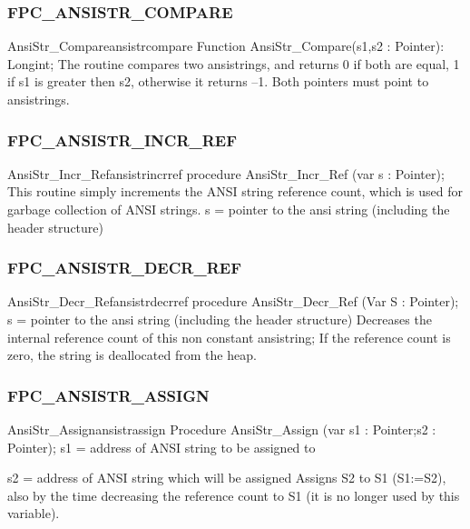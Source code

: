 \documentclass [a4paper,12pt]{article}
\begin{document}
\subsubsection{FPC{\_}ANSISTR{\_}COMPARE}
\label{subsubsec:mylabel40}

\begin{functionl}{AnsiStr{\_}Compare}{ansistrcompare}
\Declaration
Function AnsiStr{\_}Compare(s1,s2 : Pointer): Longint;
\Description
The routine compares two ansistrings, and returns 0 if both are equal, 1 if
\textsf{s1} is greater then \textsf{s2}, otherwise it returns --1.
\Parameters
Both pointers must point to ansistrings.
\end{functionl}

\subsubsection{FPC{\_}ANSISTR{\_}INCR{\_}REF }
\label{subsubsec:mylabel41}

\begin{procedurel}{AnsiStr{\_}Incr{\_}Ref}{ansistrincrref}
\Declaration
procedure AnsiStr{\_}Incr{\_}Ref (var s : Pointer);
\Description
This routine simply increments the ANSI string reference count, which is
used for garbage collection of ANSI strings.
\Parameters
s = pointer to the ansi string (including the header structure)
\end{procedurel}

\subsubsection{FPC{\_}ANSISTR{\_}DECR{\_}REF }
\label{subsubsec:mylabel42}

\begin{procedurel}{AnsiStr{\_}Decr{\_}Ref}{ansistrdecrref}
\Declaration
procedure AnsiStr{\_}Decr{\_}Ref (Var S : Pointer);
\Parameters
s = pointer to the ansi string (including the header structure)
\Algorithm
Decreases the internal reference count of this non constant ansistring; If
the reference count is zero, the string is deallocated from the
heap.
\end{procedurel}

\subsubsection{FPC{\_}ANSISTR{\_}ASSIGN }
\label{subsubsec:mylabel43}

\begin{functionl}{AnsiStr{\_}Assign}{ansistrassign}
\Declaration
Procedure AnsiStr{\_}Assign (var s1 : Pointer;s2 : Pointer);
\Parameters
s1 = address of ANSI string to be assigned to  \par
s2 = address of ANSI string which will be assigned
\Algorithm
Assigns S2 to S1 (S1:=S2), also by the time decreasing the reference count
to S1 (it is no longer used by this variable).
\end{functionl}
\end{document}
